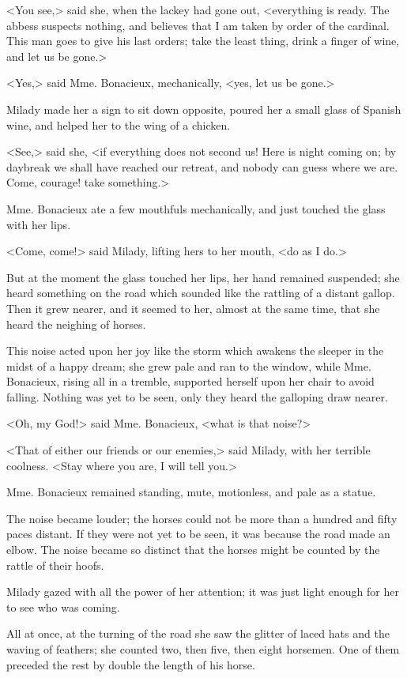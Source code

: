 <You see,> said she, when the lackey had gone out, <everything is ready. The abbess suspects nothing, and believes that I am taken by order of the cardinal. This man goes to give his last orders; take the least thing, drink a finger of wine, and let us be gone.> 

<Yes,> said Mme. Bonacieux, mechanically, <yes, let us be gone.> 

Milady made her a sign to sit down opposite, poured her a small glass of Spanish wine, and helped her to the wing of a chicken. 

<See,> said she, <if everything does not second us! Here is night coming on; by daybreak we shall have reached our retreat, and nobody can guess where we are. Come, courage! take something.> 

Mme. Bonacieux ate a few mouthfuls mechanically, and just touched the glass with her lips. 

<Come, come!> said Milady, lifting hers to her mouth, <do as I do.> 

But at the moment the glass touched her lips, her hand remained suspended; she heard something on the road which sounded like the rattling of a distant gallop. Then it grew nearer, and it seemed to her, almost at the same time, that she heard the neighing of horses. 

This noise acted upon her joy like the storm which awakens the sleeper in the midst of a happy dream; she grew pale and ran to the window, while Mme. Bonacieux, rising all in a tremble, supported herself upon her chair to avoid falling. Nothing was yet to be seen, only they heard the galloping draw nearer. 

<Oh, my God!> said Mme. Bonacieux, <what is that noise?> 

<That of either our friends or our enemies,> said Milady, with her terrible coolness. <Stay where you are, I will tell you.> 

Mme. Bonacieux remained standing, mute, motionless, and pale as a statue. 

The noise became louder; the horses could not be more than a hundred and fifty paces distant. If they were not yet to be seen, it was because the road made an elbow. The noise became so distinct that the horses might be counted by the rattle of their hoofs. 

Milady gazed with all the power of her attention; it was just light enough for her to see who was coming. 

All at once, at the turning of the road she saw the glitter of laced hats and the waving of feathers; she counted two, then five, then eight horsemen. One of them preceded the rest by double the length of his horse. 

